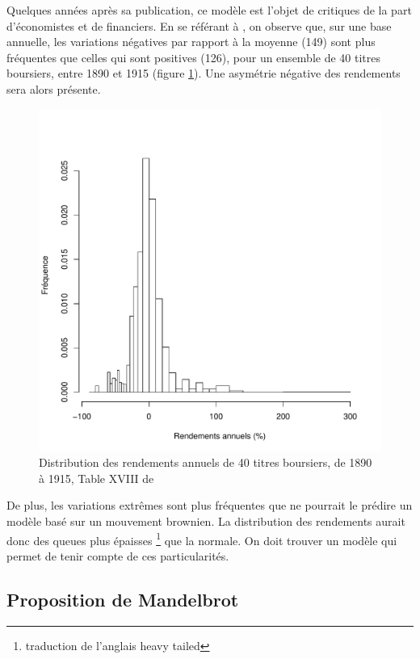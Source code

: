 Quelques années après sa publication, ce modèle est l'objet de
critiques de la part d'économistes et de financiers. En se référant à
\cite{mitchell1916critique}, on observe que, sur une base annuelle,
les variations négatives par rapport à la moyenne (149) sont plus
fréquentes que celles qui sont positives (126), pour un ensemble de 40
titres boursiers, entre 1890 et 1915 (figure \ref{fig:mitchell1}).
Une asymétrie négative des rendements sera alors présente.
\begin{figure}[!ht]
  \centering
  \includegraphics[scale=0.75]{../graphiques/mitchell1.pdf}
  \caption{Distribution des rendements annuels de 40 titres boursiers,
    de 1890 à 1915, Table XVIII de \cite{mitchell1916critique}}
  \label{fig:mitchell1}
\end{figure}

De plus, les variations extrêmes sont plus fréquentes que ne pourrait
le prédire un modèle basé sur un mouvement brownien. La distribution
des rendements aurait donc des queues plus épaisses
\footnote{traduction de l'anglais heavy tailed} que la normale. On
doit trouver un modèle qui permet de tenir compte de ces
particularités.

\subsection{Proposition de Mandelbrot}
\label{sec:mandelbrot}


